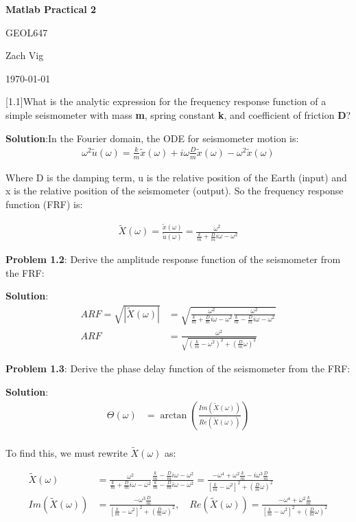 \documentclass{article} %
\newcommand{\question}[2][]{\begin{flushleft}
        \textbf{Problem #1}: #2
\end{flushleft}}
\newcommand{\sol}{\textbf{Solution}:} %
\newcommand{\maketitletwo}[2][]{
        \begin{center}
        \Large{\textbf{Matlab Practical 2}
            
            GEOL647} %
        \vspace{5pt}
        
        \normalsize{Zach Vig  %
        
        \today}        %
        \vspace{15pt}
        
        \end{center}}
\begin{document}
\maketitletwo[2]

\question[1.1]{What is the analytic expression for the frequency response function of a simple seismometer with mass \textbf{m}, spring constant \textbf{k}, and coefficient of friction \textbf{D}?}

\sol In the Fourier domain, the ODE for seismometer motion is:
\begin{align*}
\omega^2\tilde{u}(\omega) = \frac{k}{m}\tilde{x}(\omega)+i\omega\frac{D}{m}\tilde{x}(\omega)-\omega^2\tilde{x}(\omega)
\end{align*}

Where D is the damping term, u is the relative position of the Earth (input) and x is the relative position of the seismometer (output). So the frequency response function (FRF) is:

\begin{align*}
        \tilde{X}(\omega)= \frac{\tilde{x}(\omega)}{\tilde{u}(\omega)} = \frac{\omega^2}{\frac{k}{m}+\frac{D}{m}i\omega-\omega^2}
\end{align*}

\question[1.2]{Derive the amplitude response function of the seismometer from the FRF:}

\sol
\begin{align*}
        ARF = \sqrt{|\tilde{X}(\omega)|} &= \sqrt{\frac{\omega^2}{\frac{k}{m}+\frac{D}{m}i\omega-\omega^2}\frac{\omega^2}{\frac{k}{m}-\frac{D}{m}i\omega-\omega^2}} \\
        ARF &= \frac{\omega^2}{\sqrt{\left(\frac{k}{m}-\omega^2\right)^2+\left(\frac{D}{m}\omega\right)^2}}
\end{align*}

\question[1.3]{Derive the phase delay function of the seismometer from the FRF:}

\sol
\begin{align*}
        \Theta (\omega) &= \arctan\left(\frac{Im(\tilde{X}(\omega))}{Re(\tilde{X}(\omega))}\right) \\
\end{align*}

To find this, we must rewrite $\tilde{X}(\omega)$ as:

\begin{align*}
        \tilde{X}(\omega) &= \frac{\omega^2}{\frac{k}{m}+\frac{D}{m}i\omega-\omega^2}\frac{\frac{k}{m}-\frac{D}{m}i\omega-\omega^2}{\frac{k}{m}-\frac{D}{m}i\omega-\omega^2} = \frac{-\omega^4+\omega^2\frac{k}{m}-i\omega^3\frac{D}{m}}{\left[\frac{k}{m}-\omega^2\right]^2+\left(\frac{D}{m}\omega\right)^2} \\ 
        Im(\tilde{X}(\omega)) &= \frac{-\omega^3\frac{D}{m}}{\left[\frac{k}{m}-\omega^2\right]^2+\left(\frac{D}{m}\omega\right)^2}, \quad Re(\tilde{X}(\omega)) = \frac{-\omega^4 + \omega^2\frac{k}{m}}{\left[\frac{k}{m}-\omega^2\right]^2+\left(\frac{D}{m}\omega\right)^2}
\end{align*}
\end{document}
